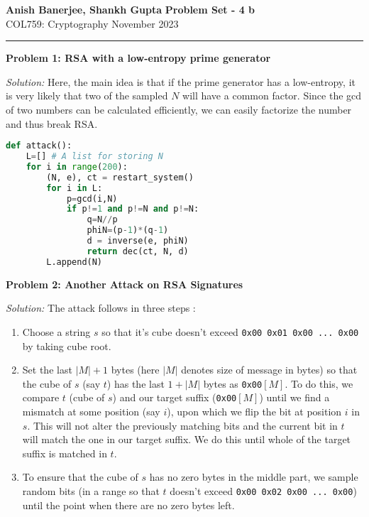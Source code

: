 \documentclass[a4paper, 11pt]{article}
\newcommand{\hr}{\noindent\rule{7in}{2.8pt}}
\newenvironment{solution}
    {\textit{Solution:}}
    {}
\newcommand{\prob}[1]{\begin{mdframed}[backgroundcolor=gray!20] \textbf{Problem #1}\end{mdframed}}
\begin{document}
\noindent
\large\textbf{Anish Banerjee, Shankh Gupta} \hfill \textbf{Problem Set - 4 b}   \\
\normalsize COL759: Cryptography \hfill November 2023\\
\hr


\prob{1: RSA with a low-entropy prime generator}
\begin{solution}
    Here, the main idea is that if the prime generator has a low-entropy, it is very likely that two of the sampled $N$ will have a common factor. Since the gcd of two numbers can be calculated efficiently, we can easily factorize the number and thus break RSA.
    \begin{lstlisting}[language=Python, caption=RSA with a low-entropy prime generator]
def attack():
    L=[] # A list for storing N
    for i in range(200):
        (N, e), ct = restart_system()
        for i in L:
            p=gcd(i,N)
            if p!=1 and p!=N and p!=N:
                q=N//p
                phiN=(p-1)*(q-1)
                d = inverse(e, phiN)
                return dec(ct, N, d)
        L.append(N)
        \end{lstlisting}
\end{solution}

\prob{2: Another Attack on RSA Signatures}
\begin{solution}
    The attack follows in three steps : 
    \begin{enumerate}
        \item Choose a string $s$ so that it's cube doesn't exceed {\tt 0x00 0x01 0x00 ... 0x00} by taking cube root.
        \item Set the last $|M|+1$ bytes (here $|M|$ denotes size of message in bytes) so that the cube of $s$ (say $t$) has the last $1+|M|$ bytes as {\tt 0x00}$[M]$. To do this, we compare $t$ (cube of $s$) and our target suffix ({\tt 0x00}$[M]$) until we find a mismatch at some position (say $i$), upon which we flip the bit at position $i$ in $s$. This will not alter the previously matching bits and the current bit in $t$ will match the one in our target suffix. We do this until whole of the target suffix is matched in $t$.
        \item To ensure that the cube of $s$ has no zero bytes in the middle part, we sample random bits (in a range so that $t$ doesn't exceed {\tt 0x00 0x02 0x00 ... 0x00}) until the point when there are no zero bytes left.
    \end{enumerate}
\end{solution}
\end{document}
